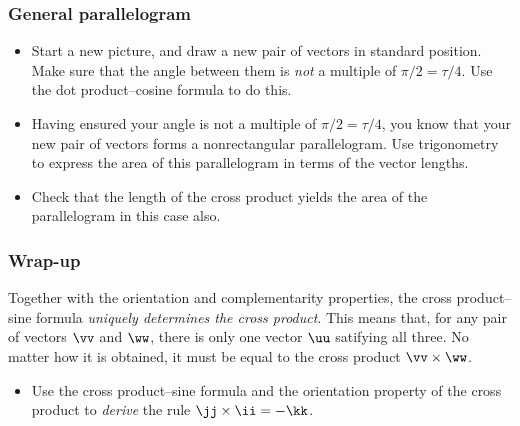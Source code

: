 \documentclass[11pt,ignorenonframetext,]{beamer}
\begin{document}
\begin{frame}\frametitle{General parallelogram}

\begin{itemize}[<+->]
\item
  Start a new picture, and draw a new pair of vectors in standard
  position. Make sure that the angle between them is \emph{not} a
  multiple of $\pi/2 = \tau/4$. Use the dot product--cosine formula to
  do this.
\item
  Having ensured your angle is not a multiple of $\pi/2 = \tau/4$, you
  know that your new pair of vectors forms a nonrectangular
  parallelogram. Use trigonometry to express the area of this
  parallelogram in terms of the vector lengths.
\item
  Check that the length of the cross product yields the area of the
  parallelogram in this case also.
\end{itemize}

\end{frame}

\begin{frame}\frametitle{Wrap-up}

Together with the orientation and complementarity properties, the cross
product--sine formula \emph{uniquely determines the cross product}. This
means that, for any pair of vectors $\vv$ and $\ww$, there is only one
vector $\uu$ satifying all three. No matter how it is obtained, it must
be equal to the cross product $\vv \times \ww$.

\begin{itemize}
\itemsep1pt\parskip0pt
\item
  Use the cross product--sine formula and the orientation property of
  the cross product to \emph{derive} the rule $\jj \times \ii = -\kk$.
\end{itemize}

\end{frame}
\end{document}

